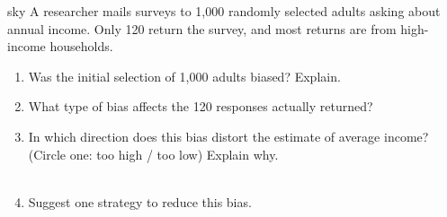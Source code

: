 \documentclass[10pt]{article}
\begin{document}
\namedateperiod

\vspace{0.14in}

\begin{scenariobox}[Context]{sky}
\small
A researcher mails surveys to 1{,}000 randomly selected adults asking about annual
income. Only 120 return the survey, and most returns are from high-income households.
\end{scenariobox}

\vspace{0.1in}

\begin{practicebox}
\small
\begin{enumerate}[leftmargin=1.5em, itemsep=10pt]
  \item Was the initial selection of 1{,}000 adults biased? \blank{3cm} Explain.\\
        \writeline

  \item What type of bias affects the 120 responses actually returned?\\
        \blank{8cm}

  \item In which direction does this bias distort the estimate of average income?
        (Circle one: too high / too low) \quad Explain why.\\
        \writeline\\[1pt]\writeline

  \item Suggest one strategy to reduce this bias.\\
        \writeline
\end{enumerate}
\end{practicebox}
\end{document}
